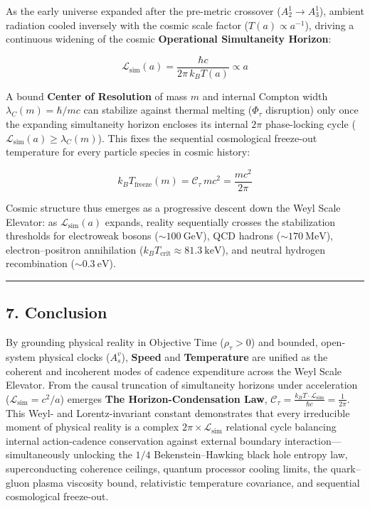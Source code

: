 \documentclass[
]{article}
\begin{document}
As the early universe expanded after the pre-metric crossover
(\(A_2^1 \to A_3^1\)), ambient radiation cooled inversely with the
cosmic scale factor (\(T(a) \propto a^{-1}\)), driving a continuous
widening of the cosmic \textbf{Operational Simultaneity Horizon}:

\[\mathcal{L}_{\mathrm{sim}}(a) = \frac{\hbar c}{2\pi\,k_B T(a)} \propto a\]

A bound \textbf{Center of Resolution} of mass \(m\) and internal Compton
width \(\lambda_C(m) = \hbar / mc\) can stabilize against thermal
melting (\(\Phi_\tau\) disruption) only once the expanding simultaneity
horizon encloses its internal \(2\pi\) phase-locking cycle
(\(\mathcal{L}_{\mathrm{sim}}(a) \ge \lambda_C(m)\)). This fixes the
sequential cosmological freeze-out temperature for every particle
species in cosmic history:

\[k_B T_{\mathrm{freeze}}(m) = \mathcal{C}_\tau\,m c^2 = \frac{m c^2}{2\pi}\]

Cosmic structure thus emerges as a progressive descent down the Weyl
Scale Elevator: as \(\mathcal{L}_{\mathrm{sim}}(a)\) expands, reality
sequentially crosses the stabilization thresholds for electroweak bosons
(\(\sim 100\ \text{GeV}\)), QCD hadrons (\(\sim 170\ \text{MeV}\)),
electron--positron annihilation
(\(k_B T_{\mathrm{crit}} \approx 81.3\ \text{keV}\)), and neutral
hydrogen recombination (\(\sim 0.3\ \text{eV}\)).

\begin{center}\rule{0.5\linewidth}{0.5pt}\end{center}

\subsection{7. Conclusion}\label{conclusion}

By grounding physical reality in Objective Time (\(\rho_\tau > 0\)) and
bounded, open-system physical clocks (\(A_s^v\)), \textbf{Speed} and
\textbf{Temperature} are unified as the coherent and incoherent modes of
cadence expenditure across the Weyl Scale Elevator. From the causal
truncation of simultaneity horizons under acceleration
(\(\mathcal{L}_{\mathrm{sim}} = c^2/a\)) emerges \textbf{The
Horizon-Condensation Law},
\(\mathcal{C}_\tau = \frac{k_B T \cdot \mathcal{L}_{\mathrm{sim}}}{\hbar c} = \frac{1}{2\pi}\).
This Weyl- and Lorentz-invariant constant demonstrates that every
irreducible moment of physical reality is a complex
\(2\pi \times \mathcal{L}_{\mathrm{sim}}\) relational cycle balancing
internal action-cadence conservation against external boundary
interaction---simultaneously unlocking the \(1/4\) Bekenstein--Hawking
black hole entropy law, superconducting coherence ceilings, quantum
processor cooling limits, the quark--gluon plasma viscosity bound,
relativistic temperature covariance, and sequential cosmological
freeze-out.
\end{document}
